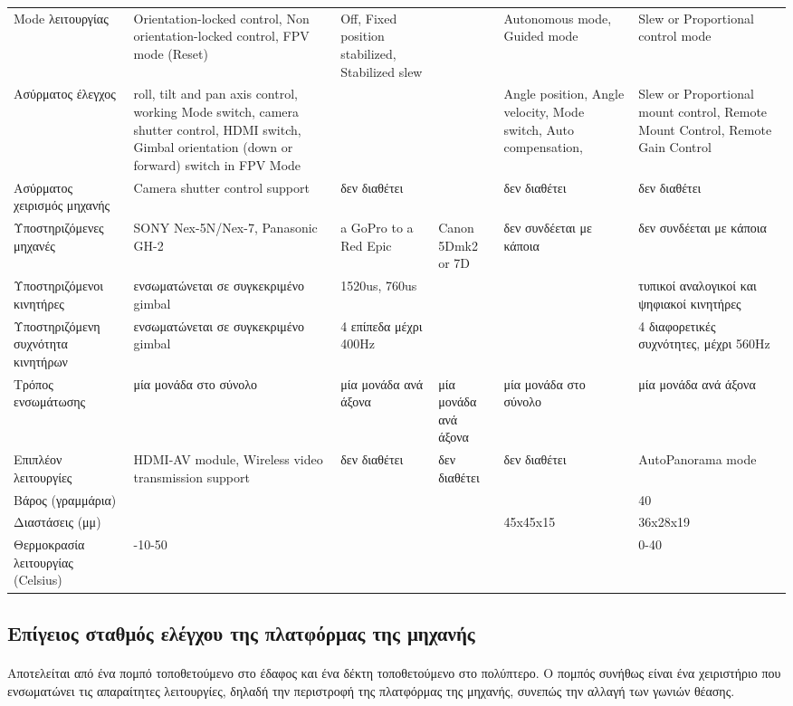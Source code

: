 \documentclass[a4paper, 12pt, twoside]{report}
\begin{document}
{{{{{{\begin{landscape}
\begin{longtable} { m{3cm} m{3cm} m{3cm} m{3cm} m{3cm} m{3cm} }
					\hdashline
					Mode λειτουργίας & Orientation-locked control, Non orientation-locked control, FPV mode (Reset) & Off, Fixed position stabilized, Stabilized slew & & Autonomous mode, Guided mode & Slew or Proportional control mode\\
					\hdashline
					Ασύρματος έλεγχος & roll, tilt and pan axis control, working Mode switch, camera shutter control, HDMI switch, Gimbal orientation (down or forward) switch in FPV Mode & & & Angle position, Angle velocity, Mode switch, Auto compensation, & Slew or Proportional mount control, Remote Mount Control, Remote Gain Control\\
					\hdashline
					Ασύρματος χειρισμός μηχανής & Camera shutter control support & δεν διαθέτει & & δεν διαθέτει & δεν διαθέτει\\
					\hdashline
					Υποστηριζόμενες μηχανές & SONY Nex-5N/Nex-7, Panasonic GH-2 & a GoPro to a Red Epic & Canon 5Dmk2 or 7D & δεν συνδέεται με κάποια & δεν συνδέεται με κάποια\\
					\hdashline
					Υποστηριζόμενοι κινητήρες & ενσωματώνεται σε συγκεκριμένο gimbal & 1520us, 760us & & & τυπικοί αναλογικοί και ψηφιακοί κινητήρες\\
					Υποστηριζόμενη συχνότητα κινητήρων  & ενσωματώνεται σε συγκεκριμένο gimbal & 4 επίπεδα μέχρι 400Hz & & & 4 διαφορετικές συχνότητες, μέχρι 560Hz\\
					\hdashline
					Τρόπος ενσωμάτωσης & μία μονάδα στο σύνολο & μία μονάδα ανά άξονα & μία μονάδα ανά άξονα & μία μονάδα στο σύνολο & μία μονάδα ανά άξονα\\
					\hdashline
					Επιπλέον λειτουργίες & HDMI-AV module, Wireless video transmission support & δεν διαθέτει & δεν διαθέτει & δεν διαθέτει & AutoPanorama mode \\
					\hdashline
					Βάρος (γραμμάρια) & & & & & 40\\
					\hdashline
					Διαστάσεις (μμ) & & & & 45x45x15 & 36x28x19\\
					\hdashline
					Θερμοκρασία λειτουργίας (Celsius) & -10-50 & & & & 0-40\\
					\hline
				\end{longtable}
				\end{landscape}
			
			
		\subsection{Επίγειος σταθμός ελέγχου της πλατφόρμας της μηχανής}
			\paragraph{}{Αποτελείται από ένα πομπό τοποθετούμενο στο έδαφος και ένα δέκτη τοποθετούμενο στο πολύπτερο. Ο πομπός συνήθως είναι ένα χειριστήριο που ενσωματώνει τις απαραίτητες λειτουργίες, δηλαδή την περιστροφή της πλατφόρμας της μηχανής, συνεπώς την αλλαγή των γωνιών θέασης.
			}
}}}}}}
\end{document}
